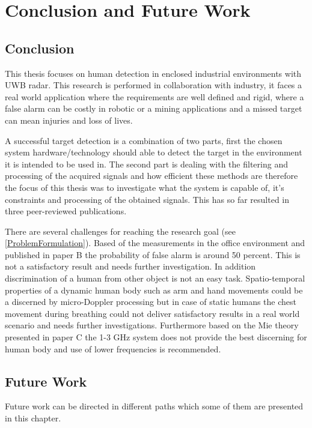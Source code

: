 \chapter{Conclusion and Future Work}
\section{Conclusion}
This thesis focuses on human detection in enclosed industrial environments with UWB radar. This research is performed in collaboration with industry, it faces a real world application where the requirements are well defined and rigid, where a false alarm can be costly in robotic or a mining applications and a missed target can mean injuries and loss of lives. 

A successful target detection is a combination of two parts, first the chosen system hardware/technology should able to detect the target in the environment it is intended to be used in. The second part is dealing with the filtering and processing of the acquired signals and how efficient these methods are therefore the focus of this thesis was to investigate what the system is capable of, it's constraints and processing of the obtained signals. This has so far resulted in three peer-reviewed publications. 

There are several challenges for reaching the research goal (see \ref{ProblemFormulation}). Based of the  measurements in the office environment and published in paper B the probability of false alarm is around 50 percent. This is not a satisfactory result and needs further investigation. In addition discrimination of a human from other object is not an easy task. Spatio-temporal properties of a dynamic human body such as arm and hand movements could be a discerned by micro-Doppler processing but in case of static humans the chest movement during breathing could not deliver satisfactory results in a real world scenario and needs further investigations. Furthermore based on the Mie theory presented in paper C the 1-3 GHz system does not provide the best discerning for human body and use of lower frequencies is recommended.

\section{Future Work}
Future work can be directed in different paths which some of them are presented in this chapter.

